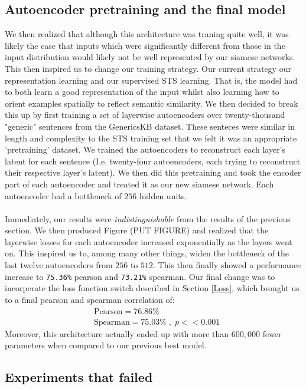 \documentclass[14pt, twocolumn]{article}
\begin{document}
\subsection{Autoencoder pretraining and the final model}
We then realized that although this architecture was traning quite well, it was likely the case that inputs which were significantly different from those in the input distribution would likely not be well represented by our siamese networks. This then inspired us to change our training strategy. Our current strategy  our representation learning and our supervised STS learning. That is, the model had to both learn a good representation of the input whilst also learning how to orient examples spatially to reflect semantic similarity. We then decided to break this up by first training a set of layerwise autoencoders over twenty-thousand "generic" sentences from the GenericsKB \cite{bhakthavatsalam2020genericskbknowledgebasegeneric} dataset. These senteces were similar in length and complexity to the STS training set that we felt it was an appropriate 'pretraining' dataset. We trained the autoencoders to reconstruct each layer's latent for each sentence (I.e. twenty-four autoencoders, each trying to reconstruct their respective layer's latent). We then did this pretraining and took the encoder part of each autoencoder and treated it as our new siamese network. Each autoencoder had a bottleneck of $256$ hidden units.\\\\
Immediately, our results were \textit{indistinguishable} from the results of the previous section. We then produced Figure (PUT FIGURE) and realized that the layerwise losses for each autoencoder increased exponentially as the layers went on. This inspired us to, among many other things, widen the bottleneck of the last twelve autoencoders from $256$ to $512$. This then finally showed a performance increase to \verb|75.36%| pearson and \verb|73.21%| spearman. Our final change was to incorperate the loss function switch described in Section \ref{Loss}, which brought us to a final pearson and spearman correlation of:
\begin{align*}
    &\text{Pearson} = 76.86\%\\
    &\text{Spearman} = 75.03\%\;,\; p << 0.001
\end{align*}
Moreover, this architecture actually ended up with more than $600,000$ fewer parameters when compared to our previous best model.

\subsection{Experiments that failed}
\end{document}
